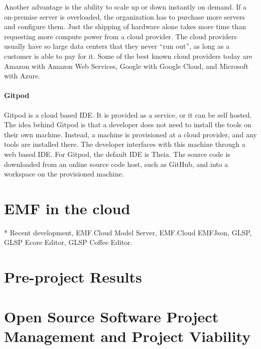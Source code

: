 Another advantage is the ability to scale up or down instantly on demand.
If a on-premise server is overloaded, the organization has to purchase more servers and configure them.
Just the shipping of hardware alone takes more time than requesting more compute power from a \gls{cloud} provider.
The cloud providers usually have so large data centers that they never ``run out'', as long as a customer is able to pay for it.
Some of the best known cloud providers today are Amazon with Amazon Web Services, Google with Google Cloud, and Microsoft with Azure.

\paragraph{Gitpod}
Gitpod is a \gls{cloud} based \acrfull{IDE}.
It is provided as a service, or it can be self hosted.
The idea behind \gls{Gitpod} is that a developer does not need to install the tools on their own machine.
Instead, a machine is provisioned at a cloud provider, and any tools are installed there.
The developer interfaces with this machine through a web based \acrshort{IDE}.
For Gitpod, the default \acrshort{IDE} is \gls{Theia}.
The source code is downloaded from an online source code host, such as \gls{GitHub}, and into a workspace on the provisioned machine. %

\section{\acrlong{EMF} in the \Gls{cloud}}
* Recent development, EMF.Cloud Model Server, EMF.Cloud EMFJson, GLSP, GLSP Ecore Editor, GLSP Coffee Editor.

\section{Pre-project Results}




\section{Open Source Software Project Management and Project Viability}

